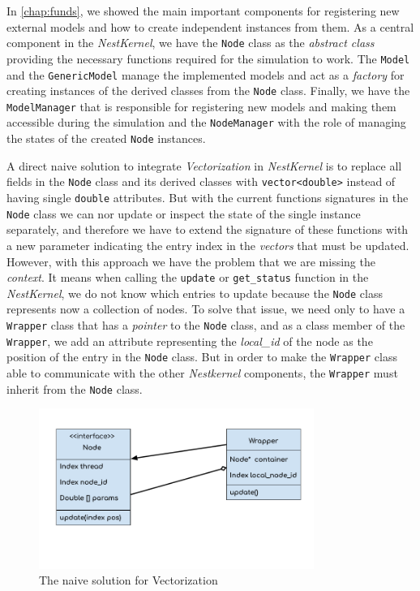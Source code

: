 In \autoref{chap:funds}, we showed the main important components for registering new external models and how to create independent instances from them. As a central component in the \emph{NestKernel}, we have the \texttt{Node} class as the \emph{abstract class} providing the necessary functions required for the simulation to work. The \texttt{Model} and the \texttt{GenericModel} manage the implemented models and act as a \emph{factory} for creating instances of the derived classes from the \texttt{Node} class. Finally, we have the \texttt{ModelManager} that is responsible for registering new models and making them accessible during the simulation and the \texttt{NodeManager} with the role of managing the states of the created \texttt{Node} instances. 


A direct naive solution to integrate \emph{Vectorization} in \emph{NestKernel} is to replace all fields in the \texttt{Node} class and its derived classes with \texttt{vector<double>} instead of having single \texttt{double} attributes. But with the current functions signatures in the \texttt{Node} class we can nor update or inspect the state of the single instance separately, and therefore we have to extend the signature of these functions with a new parameter indicating the entry index in the \emph{vectors} that must be updated. However, with this approach we have the problem that we are missing the \emph{context}. It means  when calling the \texttt{update} or \texttt{get\_status} function in the \emph{NestKernel}, we do not know which entries to update because the \texttt{Node} class represents now a collection of nodes. To solve that issue, we need only to have a \texttt{Wrapper} class that has a \emph{pointer} to the \texttt{Node} class, and as a class member of the \texttt{Wrapper}, we add an attribute representing the \emph{local\_id} of the node as the position of the entry in the \texttt{Node} class. But in order to make the \texttt{Wrapper} class able to communicate with the other \emph{Nestkernel} components, the \texttt{Wrapper} must inherit from the \texttt{Node} class.


\begin{figure}[h!]
\centering
\includegraphics[width=0.8\textwidth]{src/pic/wrapper.png}
\caption{The naive solution for Vectorization}
\label{fig:naive}
\end{figure}

